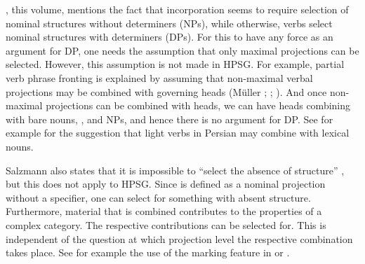 \documentclass[output=paper
  ,nobabel
  ,draftmode
  ,uniformtopskip %
  ,colorlinks, citecolor=brown
]{langscibook}
\begin{document}

\citet[Section~\ref{salzmann:sec-categorial-selection}]{chapters/salzmann}, this volume, mentions the fact that incorporation seems to
require selection of nominal structures without determiners (NPs), while otherwise, verbs select
nominal structures with determiners (DPs). For this to have any force as an argument for DP, one
needs the assumption that only maximal projections can be selected. However, this assumption is not
made in HPSG. For example, partial verb phrase fronting is explained by assuming that non-maximal
verbal projections may be combined with governing heads (Müller \citeyear{Mueller96a};
\citeyear[Section~2.2.2]{Mueller2002b}; \citealp{Meurers99a}). And once non-maximal projections can
be combined with heads, we can have heads combining with bare nouns, \nbars, and NPs, and hence
there is no argument for DP. See for example \citet[]{MuellerPersian} for the suggestion
that light verbs in Persian may combine with lexical nouns.

Salzmann also states that it is impossible to ``select the absence of structure'' \parencites[28, 32]{Salzmann2020a}[Section~\ref{salzmann:sec-agreement}]{chapters/salzmann}, but this does not apply to HPSG. Since \nbar is defined as a nominal projection without a
specifier, one can select for something with absent structure. Furthermore, material that is
combined contributes to the properties of a complex category. The respective contributions can be
selected for. This is independent of the question at which projection level the respective
combination takes place. See for example the use of the marking feature in  or . 



\end{document}

